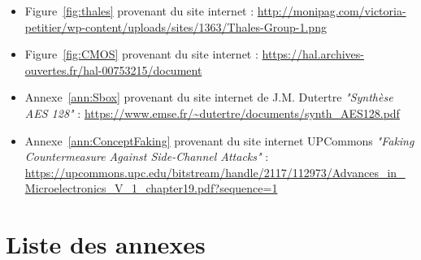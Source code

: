 \documentclass[10pt, oneside, a4paper]{article}
\makeatletter
\newcommand{\dummy@addcontentsline}[3]{}
\newcommand{\DeactivateToc}{\let\addcontentsline\dummy@addcontentsline}
\makeatother
\begin{document}
\begin{itemize}

\item Figure~\ref{fig:thales} provenant du site internet :
\url{http://monipag.com/victoria-petitier/wp-content/uploads/sites/1363/Thales-Group-1.png}

\item Figure~\ref{fig:CMOS} provenant du site internet :
\url{https://hal.archives-ouvertes.fr/hal-00753215/document}

\item Annexe~\ref{ann:Sbox} provenant du site internet de J.M. Dutertre \textit{"Synthèse AES 128"} :
\url{https://www.emse.fr/~dutertre/documents/synth_AES128.pdf}

\item Annexe~\ref{ann:ConceptFaking} provenant du site internet UPCommons \textit{"Faking Countermeasure Against Side-Channel Attacks"} :
\url{https://upcommons.upc.edu/bitstream/handle/2117/112973/Advances_in_Microelectronics_V_1_chapter19.pdf?sequence=1}

\end{itemize}


{}

\nocite{*}




\newpage

\section*{Liste des annexes}
\appendix
\DeactivateToc
\end{document}
